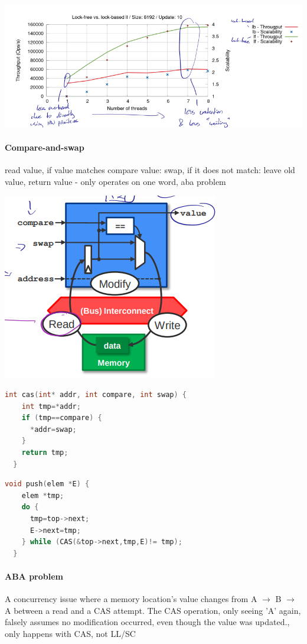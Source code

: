 \documentclass[fontsize=8pt]{scrartcl}
\begin{document}
\begin{multicols*}{4}
\begin{center}
  \centering
  \includegraphics[width=\linewidth]{img/NBDSVsLocks.png}
  \label{fig:nbdsvslocks}
\end{center}

\paragraph{Compare-and-swap} read value, if value matches compare value: swap, if it does not match: leave old value, return value  - only operates on one word, aba problem

\begin{center}
  \centering
  \includegraphics[width=0.4\linewidth]{img/compareAndSwap.png}
  \label{fig:compareandswap}
\end{center}

\begin{lstlisting}[language=c, numbers=none]
  int cas(int* addr, int compare, int swap) {
    int tmp=*addr;
    if (tmp==compare) {
      *addr=swap;
    }
    return tmp;
  } 
\end{lstlisting} %

\begin{lstlisting}[language=c, numbers=none]
  void push(elem *E) {
    elem *tmp;
    do {
      tmp=top->next;
      E->next=tmp;
    } while (CAS(&top->next,tmp,E)!= tmp);
  }
\end{lstlisting} %

\paragraph{ABA problem}A concurrency issue where a memory location's value changes from A \(\to\) B \(\to\) A between a read and a CAS attempt. The CAS operation, only seeing 'A' again, falsely assumes no modification occurred, even though the value was updated., only happens with CAS, not LL/SC



\end{multicols*}
\end{document}
